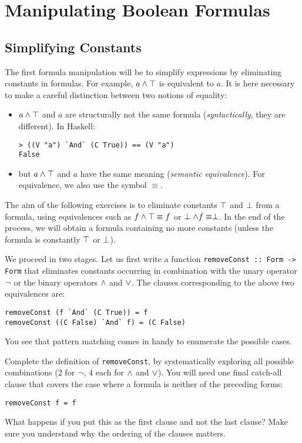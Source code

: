 \documentclass[english]{article}
\begin{document}
\section{Manipulating Boolean Formulas}\label{sec:manipulating}

\subsection{Simplifying Constants}\label{sec:simplif_const}

The first formula manipulation will be to simplify expressions by eliminating
constants in formulas. For example, $a \land \top$ is equivalent to $a$. It is
here necessary to make a careful distinction between two notions of equality:
\begin{itemize}
\item $a \land \top$ and $a$ are structurally not the same formula
  (\emph{syntactically}, they are different). In Haskell:
  \begin{lstlisting}
> ((V "a") `And` (C True)) == (V "a")
False
  \end{lstlisting}
\item but $a \land \top$ and $a$ have the same meaning (\emph{semantic
    equivalence}). For equivalence, we also use the symbol $\equiv$.
\end{itemize}

The aim of the following exercises is to eliminate constants $\top$ and
$\perp$ from a formula, using equivalences such as $f \land \top \equiv f$ or
$\perp \land f \equiv \perp$. In the end of the process, we will obtain a
formula containing no more constants (unless the formula is constantly $\top$
or $\perp$).

We proceed in two stages. Let us first write a function \texttt{removeConst ::
  Form -> Form} that eliminates constants occurring in combination with the
unary operator $\lnot$ or the binary operators $\land$ and $\lor$.
The clauses corresponding to the above two equivalences are:

\begin{lstlisting}
removeConst (f `And` (C True)) = f
removeConst ((C False) `And` f) = (C False)
\end{lstlisting}
You see that pattern matching comes in handy to enumerate the possible cases.

\begin{exo}\label{exo:removeConst}
Complete the definition of \texttt{removeConst}, by systematically exploring
all possible combinations (2 for $\lnot$, 4 each for $\land$ and $\lor$). You
will need one final catch-all clause that covers the case where a formula is
neither of the preceding forms:
\begin{lstlisting}
removeConst f = f
\end{lstlisting}
What happens if you put this as the first clause and not the last clause?
Make sure you understand why the ordering of the clauses matters.
\end{exo}
\end{document}
